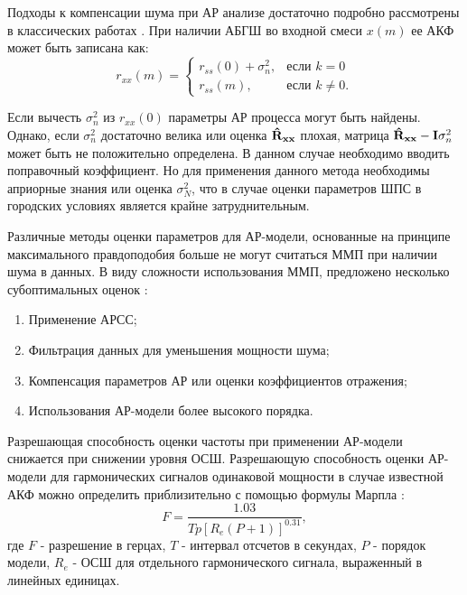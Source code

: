 Подходы к компенсации шума при АР анализе достаточно подробно рассмотрены в классических работах \cite{kay_ar_book, kay_noise_compensation}.
При наличии АБГШ во входной смеси ${x(m)}$ ее АКФ может быть записана как:
\begin{equation}
	\label{eq:acf_noise_basic}
	r_{xx}(m) =	\begin{cases}
				r_{ss}(0) + \sigma_n^2, & \mbox{если } k=0 \\
				r_{ss}(m), & \mbox{если } k \ne 0.
			\end{cases}
\end{equation}

Если вычесть ${\sigma_n^2}$ из ${r_{xx}(0)}$ параметры АР процесса могут быть найдены. Однако, если ${\sigma_n^2}$ достаточно велика или 
оценка ${{\bf{\hat{R}_{xx}}}}$ плохая, матрица ${{\bf{\hat{R}_{xx}}} - {\bf{I}}\sigma_n^2}$ может быть не положительно определена. В данном
случае необходимо вводить поправочный коэффициент. Но для применения данного метода необходимы априорные знания или оценка ${\sigma_N^2}$,
что в случае оценки параметров ШПС в городских условиях является крайне затруднительным.

Различные методы оценки параметров для АР-модели, основанные на принципе максимального правдоподобия больше не
могут считаться ММП при наличии шума в данных. В виду сложности использования ММП, предложено несколько 
субоптимальных оценок \cite{marpl_book, kay_ar_book}:
\begin{enumerate}
	\item Применение АРСС;
	\item Фильтрация данных для уменьшения мощности шума;
	\item Компенсация параметров АР или оценки коэффициентов отражения;
	\item Использования АР-модели более высокого порядка.
\end{enumerate}

Разрешающая способность оценки частоты при применении АР-модели снижается при снижении уровня ОСШ. Разрешающую способность оценки АР-модели для гармонических сигналов
одинаковой мощности в случае известной АКФ можно определить приблизительно с помощью формулы Марпла \cite{marpl_book, kay_ar_book}:
\begin{equation}
	\label{eq:lpc_est_quality_1}
	F = \frac{1.03}{Tp[R_e(P+1)]^{0.31}},
\end{equation}
где ${F}$ - разрешение в герцах, ${T}$ - интервал отсчетов в секундах, ${P}$ - порядок модели, ${R_e}$ - ОСШ для отдельного гармонического сигнала, выраженный в линейных единицах.


